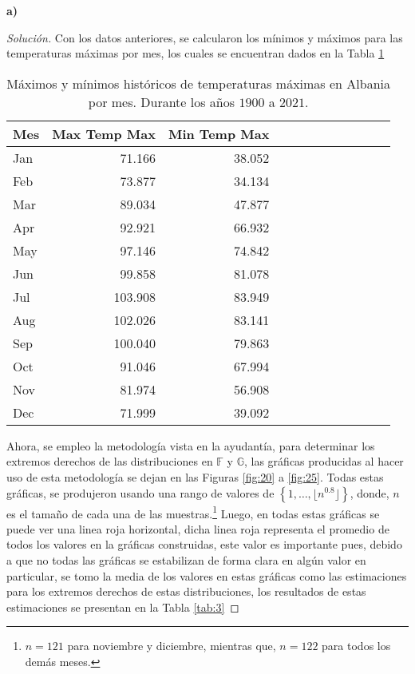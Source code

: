 \documentclass[10.5pt,notitlepage]{article}
\newenvironment{solucion}
  {\begin{proof}[Solución]}
  {\end{proof}}
\newcommand{\FF}{\mathbb{F}}
\newcommand{\GG}{\mathbb{G}}
\newcommand{\kis}[1]{\left\{ #1 \right\}}
\newcommand{\floor}[1]{\lfloor #1 \rfloor}
\theoremstyle{plain}
\begin{document}
\textbf{a)}
\begin{solucion}
 Con los datos anteriores, se calcularon los mínimos y máximos para las temperaturas máximas por mes, los cuales se encuentran dados en la Tabla \ref{tab:2} 
\begin{table}[H]
        \centering
        \begin{tabular}{@{}l@{\hskip 0.3in}r@{\hskip 0.3in}r@{\hskip 0.3in}r@{\hskip 0.3in}r@{\hskip 0.3in}r@{\hskip 0.3in}r@{\hskip 0.3in}r@{\hskip 0.3in}r@{\hskip 0.3in}r@{\hskip 0.3in}r@{\hskip 0.3in}r@{}}
        \toprule
     Mes & Max Temp Max & Min Temp Max\\
        \midrule         
   Jan&71.166&38.052  \\            
   Feb&73.877&34.134\\
   Mar&89.034&47.877\\ 
   Apr&92.921&66.932 \\ 
   May&97.146&74.842\\   
   Jun &99.858&81.078\\  
   Jul &103.908&83.949\\   
   Aug &102.026&83.141\\  
   Sep& 100.040& 79.863\\  
   Oct& 91.046& 67.994\\
   Nov& 81.974& 56.908\\   
   Dec& 71.999&39.092\\ 
        \end{tabular}
        \caption{Máximos y mínimos históricos de temperaturas máximas en Albania por mes. Durante los años \(1900\) a \(2021\).}
        \label{tab:2}
\end{table}
Ahora, se empleo la metodología vista en la ayudantía, para determinar los extremos derechos de las distribuciones en \(\FF\) y \(\GG\), las gráficas producidas al hacer uso de esta metodología se dejan en las Figuras \ref{fig:20} a \ref{fig:25}. Todas estas gráficas, se produjeron usando una rango de valores de \(\kis{1, \hdots, \floor{n^{0.8}}}\), donde, \(n\) es el tamaño de cada una de las muestras.\footnote{\(n = 121\) para noviembre y diciembre, mientras que, \(n= 122\) para todos los demás meses.} Luego, en todas estas gráficas se puede ver una linea roja horizontal, dicha linea roja representa el promedio de todos los valores en la gráficas construidas, este valor es importante pues, debido a que no todas las gráficas se estabilizan de forma clara en algún valor en particular, se tomo la media de los valores en estas gráficas como las estimaciones para los extremos derechos de estas distribuciones, los resultados de estas estimaciones se presentan en la Tabla \ref{tab:3}

\end{solucion}
\end{document}
